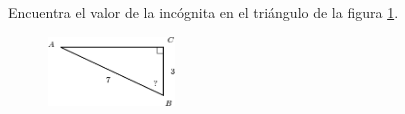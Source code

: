 Encuentra el valor de la incógnita en el triángulo de la figura \ref{fig:angle_functrig_13}.
\begin{figure}[H]
    \begin{center}
        \includegraphics[width=0.3\textwidth]{../images/angle_functrig_13.png}
    \end{center}
    \caption{}
    \label{fig:angle_functrig_13}
\end{figure}